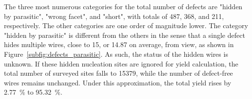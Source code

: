 The three most numerous categories for the total number of defects are "hidden by parasitic", "wrong facet", and "short", with totals of \num{487}, \num{368}, and \num{211}, respectively. The other categories are one order of magnitude lower. The category "hidden by parasitic" is different from the others in the sense that a single defect hides multiple wires, close to \num{15}, or \num{14.87} on average, from view, as shown in Figure~\ref{subfig:defects_parasitic}. As such, the status of the hidden wires is unknown. If these hidden nucleation sites are ignored for yield calculation, the total number of surveyed sites falls to \num{15379}, while the number of defect-free wires remains unchanged. Under this approximation, the total yield rises by \qty{2.77}{\percent} to \qty{95.32}{\percent}.

